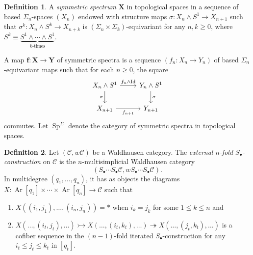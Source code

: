 \documentclass[10pt,letterpaper,cm]{nupset}
\theoremstyle{definition}
\newtheorem{definition}{Definition}[section]
\theoremstyle{theorem}
\theoremstyle{remark}
\newcommand{\X}{\mathbf X}
\newcommand{\1}{\mathbf{1}}
\renewcommand{\c}{\mathscr{C}}
\newcommand{\0}{\vec 0}
\DeclareMathOperator{\id}{Id}
\DeclareMathOperator{\Ar}{Ar}
\DeclareMathOperator{\Sp}{Sp}
\begin{document}
\begin{definition}
 A \textit{symmetric spectrum} $\X$ in topological spaces in a sequence of based $\Sigma_n$-spaces $(X_n)$ endowed with structure maps $\sigma : X_n \land S^1 \to X_{n+1}$ such that $\sigma^k : X_n \land S^k \to X_{n+k}$ is $\left(\Sigma_{n}\times \Sigma_{k}\right)$-equivariant for any $n,k\geq 0$, where $S^k \equiv \underbrace{S^1 \land \cdots \land S^1}_{k\text{-times}}$. 
 
 \smallskip
 
 A map $\mathbf{f} : \X \to \mathbf{Y}$ of symmetric spectra is a sequence $\left(f_n : X_n \to Y_n\right)$ of based $\Sigma_n$-equivariant maps such that for each $n\geq 0$, the square
\[
\begin{tikzcd}
X_n \land S^1 \arrow[d, "\sigma"'] \arrow[r, "f_n \land \id"] & Y_n \land S^1 \arrow[d, "\sigma"] \\
X_{n+1} \arrow[r, "f_{n+1}"'] & Y_{n+1}
\end{tikzcd}
\]
commutes. Let $\Sp^{\Sigma}$ denote the category of symmetric spectra in topological spaces.
\end{definition}

\begin{definition}
Let $(\c,w{\c})$ be a Waldhausen category. The \textit{external $n$-fold $S_{\bullet}$-construction} on $\c$ is the $n$-multisimplicial Waldhausen category $$\left(S_{\bullet}\cdots S_{\bullet}\c, wS_{\bullet} \cdots S_{\bullet} \c\right).$$ In multidegree $\left(q_1, \ldots, q_n\right)$, it has as objects the diagrams  $X: \Ar[q_1] \times \cdots \times \Ar[q_n] \to \c$ such that
\begin{enumerate}[label=(\roman*)]
\item $X((i_1, j_1), \ldots, (i_n, j_n)) = \ast$ when $i_k = j_k$ for some $1\leq k \leq n$ and
\item $X(\ldots, (i_t, j_t), \ldots) \rightarrowtail X(\ldots, (i_t, k_t), \ldots) \twoheadrightarrow X(\ldots, (j_t, k_t), \ldots)$ is a cofiber sequence  in the $(n-1)$-fold iterated $S_{\bullet}$-construction for any $i_t \leq j_t \leq k_t$ in $[q_t]$.
\end{enumerate}
\end{definition}
\end{document}
